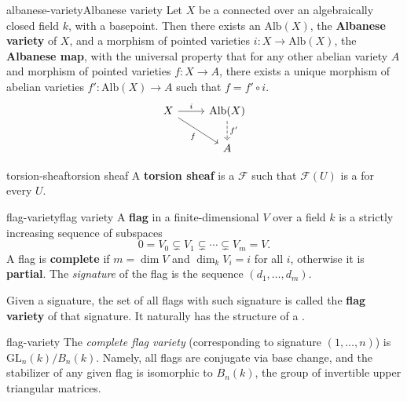 \begin{topic}{albanese-variety}{Albanese variety}
    Let $X$ be a connected   over an algebraically closed field $k$, with a basepoint. Then there exists an  $\text{Alb}(X)$, the \textbf{Albanese variety} of $X$, and a morphism of pointed varieties $i : X \to \text{Alb}(X)$, the \textbf{Albanese map}, with the universal property that for any other abelian variety $A$ and morphism of pointed varieties $f : X \to A$, there exists a unique morphism of abelian varieties $f' : \text{Alb}(X) \to A$ such that $f = f' \circ i$.
    \[ \begin{tikzcd} X \arrow{r}{i} \arrow[swap]{dr}{f} &  \text{Alb}(X) \arrow[dashed]{d}{f'} \\ &  A \end{tikzcd} \]
\end{topic}

\begin{topic}{torsion-sheaf}{torsion sheaf}
    A \textbf{torsion sheaf} is a  $\mathcal{F}$ such that $\mathcal{F}(U)$ is a   for every $U$.
\end{topic}

\begin{topic}{flag-variety}{flag variety}
    A \textbf{flag} in a finite-dimensional  $V$ over a field $k$ is a strictly increasing sequence of subspaces
    \[ 0 = V_0 \subsetneq V_1 \subsetneq \cdots \subsetneq V_m = V . \]
    A flag is \textbf{complete} if $m = \dim V$ and $\dim_k V_i = i$ for all $i$, otherwise it is \textbf{partial}. The \textit{signature} of the flag is the sequence $(d_1, \ldots, d_m)$.
    
    Given a signature, the set of all flags with such signature is called the \textbf{flag variety} of that signature. It naturally has the structure of a  .
\end{topic}

\begin{example}{flag-variety}
    The \textit{complete flag variety} (corresponding to signature $(1, \ldots, n)$) is $\text{GL}_n(k) / B_n(k)$. Namely, all flags are conjugate via base change, and the stabilizer of any given flag is isomorphic to $B_n(k)$, the group of invertible upper triangular matrices.
\end{example}

